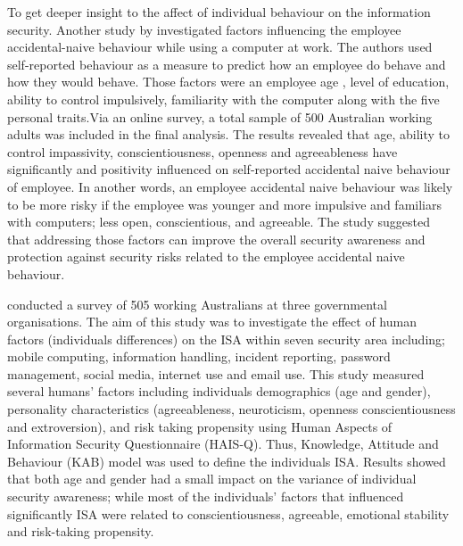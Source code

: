 To get deeper insight to the affect of individual behaviour on the information security. Another study by \cite{Parsons2014} investigated factors influencing the employee accidental-naive behaviour while using a computer at work. The authors used self-reported behaviour as a measure to predict how an employee do behave and how they would behave. Those factors were an employee age , level of education, ability to control impulsively, familiarity with the computer along with the five personal traits.Via an online survey, a total sample of 500 Australian working adults was included in the final analysis. The results revealed that age, ability to control impassivity, conscientiousness, openness  and agreeableness have significantly and positivity influenced on self-reported accidental naive behaviour of employee. In another words, an employee accidental naive behaviour was likely to be more risky if the employee was younger and more impulsive and familiars with computers; less open, conscientious, and agreeable. The study suggested that addressing those factors can improve the overall security awareness and protection against  security risks related to the employee accidental naive behaviour.   
  
\citet{McCormac2016} conducted a survey of 505 working Australians at three governmental organisations. The aim of this study was to investigate the effect of human factors (individuals differences) on the ISA within seven security area including; mobile computing, information handling, incident reporting, password management, social media, internet use and email use. This study measured several humans' factors including individuals demographics (age and gender), personality characteristics (agreeableness, neuroticism, openness conscientiousness and extroversion), and risk taking propensity using Human Aspects of Information Security Questionnaire (HAIS-Q). Thus, Knowledge, Attitude and Behaviour (KAB) model was used to define the individuals ISA. Results showed that both age and gender had a small impact on the variance of individual security awareness; while most of the individuals' factors that  influenced significantly ISA were related to conscientiousness, agreeable, emotional stability and risk-taking propensity.

